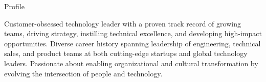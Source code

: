 \documentclass{resume} %
\begin{document}
\vspace{-1em}
\begin{rSection}{Profile}
  
  Customer-obsessed technology leader with a proven track record of growing teams, driving strategy, instilling technical excellence, and developing high-impact opportunities. Diverse career history spanning leadership of engineering, technical sales, and product teams at both cutting-edge startups and global technology leaders. Passionate about enabling organizational and cultural transformation by evolving the intersection of people and technology.
  
\end{rSection}

\end{document}
